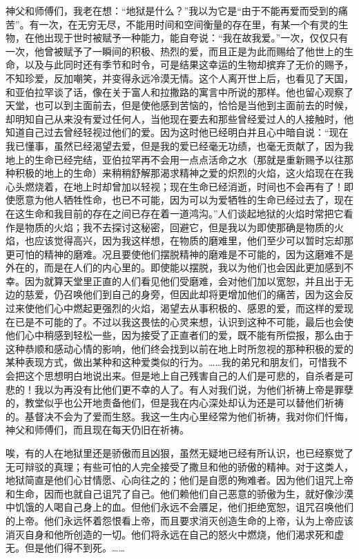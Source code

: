 \par 神父和师傅们，我老在想：“地狱是什么？”我以为它是“由于不能再爱而受到的痛苦”。有一次，在无穷无尽，不能用时间和空间衡量的存在里，有某一个有灵的生物，在他出现于世时被赋予一种能力，能自夸说：“我在故我爱。”一次，仅仅只有一次，他曾被赋予了一瞬间的积极、热烈的爱，而且正是为此而赐给了他世上的生命，以及与此同时还有季节和时令，可是结果这幸运的生物却摈弃了无价的赐予，不知珍爱，反加嘲笑，并变得永远冷漠无情。这个人离开世上后，也看见了天国，和亚伯拉罕谈了话，像在关于富人和拉撒路的寓言中所说的那样。他也留心观察了天堂，也可以到主面前去，但是使他感到苦恼的，恰恰是当他到主面前去的时候，却明知自己从来没有爱过任何人，当他现在要去和那些曾经爱过人的人接触时，他知道自己过去曾经轻视过他们的爱。因为这时他已经明白并且心中暗自说：“现在我已懂事，虽然已经渴望去爱，但是我的爱已经毫无功绩，也毫无贡献了，因为我地上的生命已经完结，亚伯拉罕再不会用一点点活命之水（那就是重新赐予以往那种积极的地上的生命）来稍稍舒解那渴求精神之爱的炽烈的火焰，这火焰现在在我心头燃烧着，在地上时却曾加以轻视；现在生命已经消逝，时间也不会再有了！即使愿意为他人牺牲性命，也已不可能，因为可以为爱牺牲的生命已经过去了，现在在这生命和我目前的存在之间已存在着一道鸿沟。”人们谈起地狱的火焰时常把它看作是物质的火焰；我不去探讨这秘密，回避它，但是我以为即使那确是物质的火焰，也应该觉得高兴，因为我这样想，在物质的磨难里，他们至少可以暂时忘却那更可怕的精神的磨难。况且要使他们摆脱精神的磨难是不可能的，因为这磨难不是外在的，而是在人们的内心里的。即使能以摆脱，我以为他们也会因此更加感到不幸。因为就算天堂里正直的人们看见他们受磨难，会对他们加以宽恕，并且出于无边的慈爱，仍召唤他们到自己的身旁，但因此却将更增加他们的痛苦，因为这会反过来使他们心中燃起更强烈的火焰，渴望去从事积极的、感恩的爱，而这样的爱现在已是不可能的了。不过以我这畏怯的心灵来想，认识到这种不可能，最后也会使他们心中稍感到轻松一些，因为接受了正直者们的爱，既不能有所偿报，那么由于这种恭顺和感动心情的影响，他们终会找到以前在地上时所忽视的那种积极的爱的某种表现方式，做出某种和这种爱类似的行为。……我的弟兄和朋友们，可惜我不会把这个思想明白地说出来。但是地上自己残害自己的人们是可悲的，自杀者是可悲的！我以为再没有比他们更不幸的人了。有人对我们说，为他们祈祷上帝是罪孽的，教堂似乎也公开地责备他们，但是我在内心深处却认为还是可以替他们祈祷的。基督决不会为了爱而生怒。我这一生内心里经常为他们祈祷，我对你们忏悔，神父和师傅们，而且现在每天仍旧在祈祷。
\par 唉，有的人在地狱里还是骄傲而且凶狠，虽然无疑地已经有所认识，也已经察觉了无可辩驳的真理；有些可怕的人完全接受了撒旦和他的骄傲的精神。对于这类人，地狱简直是他们心甘情愿、心向往之的；他们是自愿的殉难者。因为他们诅咒上帝和生命，因而也就自己诅咒了自己。他们赖他们自己恶意的骄傲为生，就好像沙漠中饥饿的人喝自己身上的血。但他们永远不会餍足，他们拒绝宽恕，诅咒召唤他们的上帝。他们永远怀着怨恨看上帝，而且要求消灭创造生命的上帝，认为上帝应该消灭自身和他所创造的一切。他们将永远在自己的怒火中燃烧，他们渴求死和虚无。但是他们得不到死。……
